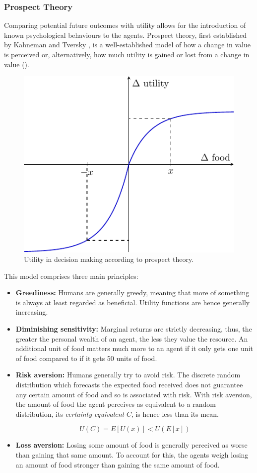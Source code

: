 \subsubsection{Prospect Theory}

Comparing potential future outcomes with utility allows for the introduction of known psychological behaviours to the agents. Prospect theory, first established by Kahneman and Tversky \cite{kahneman2013prospect}, is a well-established model of how a change in value is perceived or, alternatively, how much utility is gained or lost from a change in value (). 

\begin{figure} [htb]
    \centering
    \includegraphics[width=0.5\linewidth]{008_team_6_agent_design/SOMAS_prospect_theory.pdf}
    \caption{Utility in decision making according to prospect theory.}
    \label{fig:prospect}
\end{figure}

This model comprises three main principles:
\begin{itemize}
    \item \textbf{Greediness:} Humans are generally greedy, meaning that more of something is always at least regarded as beneficial. Utility functions are hence generally increasing.
    
    \item \textbf{Diminishing sensitivity:} Marginal returns are strictly decreasing, thus, the greater the personal wealth of an agent, the less they value the resource. An additional unit of food matters much more to an agent if it only gets one unit of food compared to if it gets 50 units of food.
    
    \item \textbf{Risk aversion:} Humans generally try to avoid risk. The discrete random distribution which forecasts the expected food received does not guarantee any certain amount of food and so is associated with risk. With risk aversion, the amount of food the agent perceives as equivalent to a random distribution, its \textit{certainty equivalent} $C$, is hence less than its mean.

    \begin{equation}
    U(C) = E[U(x)] < U(E[x])    
    \end{equation}
    
    \item \textbf{Loss aversion:} Losing some amount of food is generally perceived as worse than gaining that same amount. To account for this, the agents weigh losing an amount of food stronger than gaining the same amount of food.
\end{itemize}

